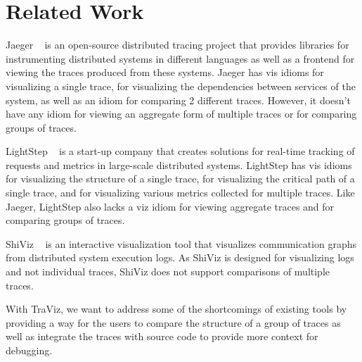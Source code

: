 \section{Related Work}

Jaeger ~\cite{Jaeger} is an open-source distributed tracing project
that provides libraries for instrumenting distributed systems
in different languages as well as a frontend for viewing the traces
produced from these systems. Jaeger has vis idioms for visualizing
a single trace, for visualizing the dependencies between services
of the system, as well as an idiom for comparing 2 different traces.
However, it doesn't have any idiom for viewing an aggregate form of
multiple traces or for comparing groups of traces.

LightStep ~\cite{LightStep} is a start-up company that
creates solutions for real-time tracking of requests and metrics
in large-scale distributed systems. LightStep has vis idioms
for visualizing the structure of a single trace, for visualizing
the critical path of a single trace, and 
for visualizing various metrics collected for multiple traces.
Like Jaeger, LightStep also lacks a viz idiom for viewing aggregate
traces and for comparing groups of traces.

ShiViz ~\cite{ShiViz} is an interactive visualization tool
that visualizes communication graphs from distributed system execution
logs. As ShiViz is designed for visualizing logs and not individual traces,
ShiViz does not support comparisons of multiple traces.

With TraViz, we want to address some of the shortcomings of existing tools
by providing a way for the users to compare the structure of a group of traces
as well as integrate the traces with source code to provide more context
for debugging.